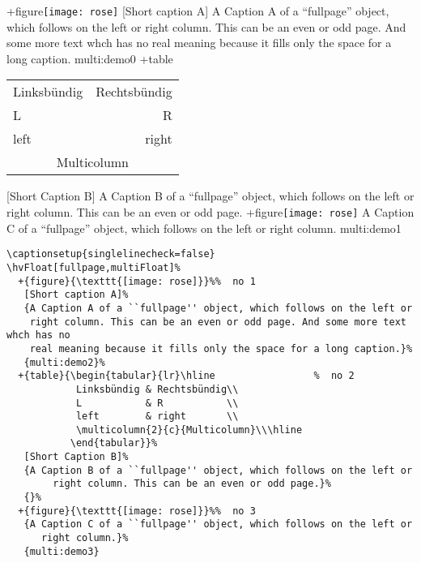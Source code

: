 \documentclass[twocolumn]{scrartcl}
\begin{document}
\Float[Multi]
\captionsetup{singlelinecheck=false}
%
  +{figure}{\texttt{[image: rose]}}%
   [Short caption A]%
   {A Caption A of a ``fullpage'' object, which follows on the left or
    right column. This can be an even or odd page. And some more text whch has no
    real meaning because it fills only the space for a long caption.}%
   {multi:demo0}%
  +{table}{\begin{tabular}{lr}\hline                 %
            Linksbündig & Rechtsbündig\\
            L           & R           \\
            left        & right       \\
            \multicolumn{2}{c}{Multicolumn}\\\hline
           \end{tabular}}%
   [Short Caption B]%
   {A Caption B of a ``fullpage'' object, which follows on the left or
        right column. This can be an even or odd page.}{}%
  +{figure}{\texttt{[image: rose]}}%
   {A Caption C of a ``fullpage'' object, which follows on the left or
      right column.}%
   {multi:demo1}




\blinddocument



\begin{lstlisting}
\captionsetup{singlelinecheck=false}
\hvFloat[fullpage,multiFloat]%
  +{figure}{\texttt{[image: rose]}}%%  no 1
   [Short caption A]%
   {A Caption A of a ``fullpage'' object, which follows on the left or
    right column. This can be an even or odd page. And some more text whch has no
    real meaning because it fills only the space for a long caption.}%
   {multi:demo2}%
  +{table}{\begin{tabular}{lr}\hline                 %  no 2
            Linksbündig & Rechtsbündig\\
            L           & R           \\
            left        & right       \\
            \multicolumn{2}{c}{Multicolumn}\\\hline
           \end{tabular}}%
   [Short Caption B]%
   {A Caption B of a ``fullpage'' object, which follows on the left or
        right column. This can be an even or odd page.}%
   {}%
  +{figure}{\texttt{[image: rose]}}%%  no 3
   {A Caption C of a ``fullpage'' object, which follows on the left or
      right column.}%
   {multi:demo3}
\end{lstlisting}
\end{document}
